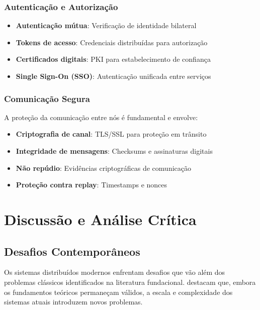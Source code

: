 \subsubsection{Autenticação e Autorização}

\begin{itemize}
    \item \textbf{Autenticação mútua}: Verificação de identidade bilateral
    \item \textbf{Tokens de acesso}: Credenciais distribuídas para autorização
    \item \textbf{Certificados digitais}: PKI para estabelecimento de confiança
    \item \textbf{Single Sign-On (SSO)}: Autenticação unificada entre serviços
\end{itemize}

\subsubsection{Comunicação Segura}

A proteção da comunicação entre nós é fundamental e envolve:

\begin{itemize}
    \item \textbf{Criptografia de canal}: TLS/SSL para proteção em trânsito
    \item \textbf{Integridade de mensagens}: Checksums e assinaturas digitais
    \item \textbf{Não repúdio}: Evidências criptográficas de comunicação
    \item \textbf{Proteção contra replay}: Timestamps e nonces
\end{itemize}



\section{Discussão e Análise Crítica}

\subsection{Desafios Contemporâneos}

Os sistemas distribuídos modernos enfrentam desafios que vão além dos problemas clássicos identificados na literatura fundacional.  destacam que, embora os fundamentos teóricos permaneçam válidos, a escala e complexidade dos sistemas atuais introduzem novos problemas.

